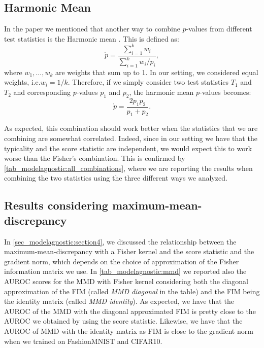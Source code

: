 {\subsection{Harmonic Mean}
\label{appendix_modelagnostic:harmonic}
In the paper we mentioned that another way to combine $p$-values from different test statistics is the Harmonic mean \parencite{wilson_harmonic_2019}. This is defined as:
\begin{equation}
    \mathring{p} = \frac{\sum_{i=1}^{k} w_i}{\sum_{i=1}^{k} w_i / p_i},
\end{equation}
where $w_1,\dots,w_k$ are weights that sum up to 1. In our setting, we considered equal weights, i.e.\@ $w_i = 1 / k$. Therefore, if we simply consider two test statistics $T_1$ and $T_2$ and corresponding $p$-values $p_1$ and $p_2$, the harmonic mean $p$-values becomes:
\begin{equation}
    \mathring{p} = \frac{2 p_1 p_2}{p_1 + p_2}.
\end{equation}

As expected, this combination should work better when the statistics that we are combining are somewhat correlated. Indeed, since in our setting we have that the typicality and the score statistic are independent, we would expect this to work worse than the Fisher's combination. This is confirmed by \cref{tab_modelagnostic:all_combinations}, where we are reporting the results when combining the two statistics using the three different ways we analyzed.

\subsection{Results considering maximum-mean-discrepancy}
In \cref{sec_modelagnostic:section4}, we discussed the relationship between the maximum-mean-discrepancy with a Fisher kernel and the score statistic and the gradient norm, which depends on the choice of approximation of the Fisher information matrix we use. In \cref{tab_modelagnostic:mmd} we reported also the AUROC scores for the MMD with Fisher kernel considering both the diagonal approximation of the FIM (called \emph{MMD diagonal} in the table) and the FIM being the identity matrix (called \emph{MMD identity}). As expected, we have that the AUROC of the MMD with the diagonal approximated FIM is pretty close to the AUROC we obtained by using the score statistic. Likewise, we have that the AUROC of MMD with the identity matrix as FIM is close to the gradient norm when we trained on FashionMNIST and CIFAR10. 

}
